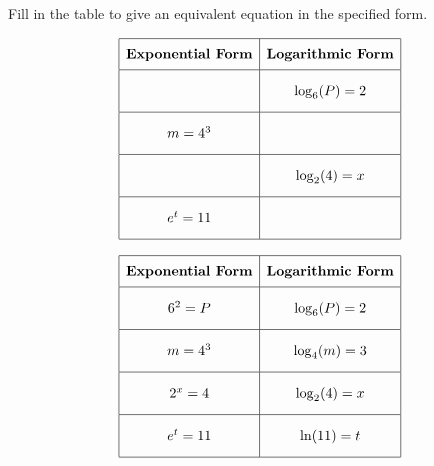 \question[5] 
Fill in the table to give an equivalent equation in the specified form.

 \[\begin{array}{|c|c|} \hline \rule[-0.8em]{0pt}{2.2em} \textbf{Exponential Form} & \textbf{Logarithmic Form} \\ \hline \rule[-1.2em]{0pt}{3em} \hspace{3cm} & \log_{6}(P) = 2 \\ \hline \rule[-1.2em]{0pt}{3em} m = 4^{3} & \hspace{3cm} \\ \hline \rule[-1.2em]{0pt}{3em} \hspace{3cm} & \log_{2}(4) = x \\ \hline \rule[-1.2em]{0pt}{3em} e^{t} = 11 & \hspace{3cm} \\ \hline \end{array}\] 

\begin{solution}
\[\begin{array}{|c|c|} \hline \rule[-0.8em]{0pt}{2.2em} \textbf{Exponential Form} & \textbf{Logarithmic Form} \\ \hline \rule[-1.2em]{0pt}{3em} 6^{2} = P & \log_{6}(P) = 2 \\ \hline \rule[-1.2em]{0pt}{3em} m = 4^{3} & \log_{4}(m) = 3 \\ \hline \rule[-1.2em]{0pt}{3em} 2^{x} = 4 & \log_{2}(4) = x \\ \hline \rule[-1.2em]{0pt}{3em} e^{t} = 11 & \ln(11) = t \\ \hline \end{array}\]
\end{solution}


